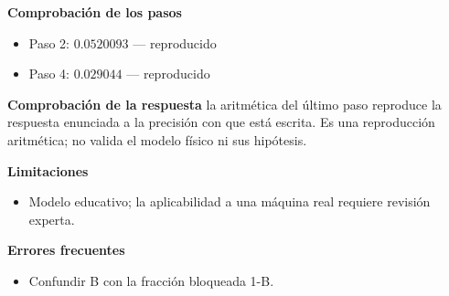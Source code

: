 \documentclass[10pt,openany]{book}
\begin{document}
\begin{tcolorbox}[title={Problema resuelto 2}, studiumworked, breakable]
\noindent\textbf{Comprobación de los pasos}
\begin{itemize}
\item Paso 2: $0.0520093$ — reproducido
\item Paso 4: $0.029044$ — reproducido
\end{itemize}

\noindent\textbf{Comprobación de la respuesta} la aritmética del último paso reproduce la respuesta enunciada a la precisión con que está escrita. Es una reproducción aritmética; no valida el modelo físico ni sus hipótesis.

\noindent\textbf{Limitaciones}
\begin{itemize}
\item Modelo educativo; la aplicabilidad a una máquina real requiere revisión experta.
\end{itemize}

\noindent\textbf{Errores frecuentes}
\begin{itemize}
\item Confundir B con la fracción bloqueada 1-B.
\end{itemize}
\end{tcolorbox}
\end{document}
